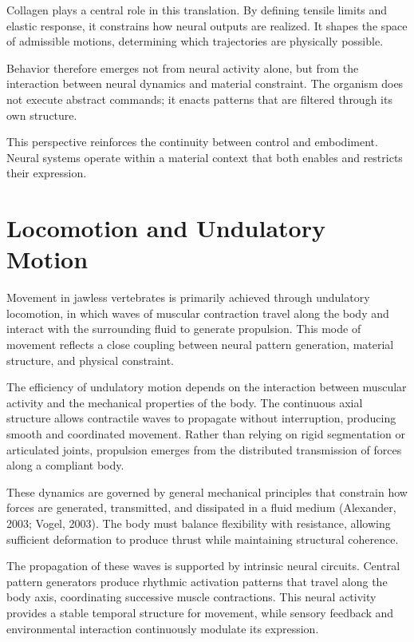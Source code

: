\documentclass[11pt,oneside]{book}
\begin{document}
Collagen plays a central role in this translation. By defining tensile limits and elastic response, it constrains how neural outputs are realized. It shapes the space of admissible motions, determining which trajectories are physically possible.

Behavior therefore emerges not from neural activity alone, but from the interaction between neural dynamics and material constraint. The organism does not execute abstract commands; it enacts patterns that are filtered through its own structure.

This perspective reinforces the continuity between control and embodiment. Neural systems operate within a material context that both enables and restricts their expression.

\section{Locomotion and Undulatory Motion}

Movement in jawless vertebrates is primarily achieved through undulatory locomotion, in which waves of muscular contraction travel along the body and interact with the surrounding fluid to generate propulsion. This mode of movement reflects a close coupling between neural pattern generation, material structure, and physical constraint.

The efficiency of undulatory motion depends on the interaction between muscular activity and the mechanical properties of the body. The continuous axial structure allows contractile waves to propagate without interruption, producing smooth and coordinated movement. Rather than relying on rigid segmentation or articulated joints, propulsion emerges from the distributed transmission of forces along a compliant body.

These dynamics are governed by general mechanical principles that constrain how forces are generated, transmitted, and dissipated in a fluid medium (Alexander, 2003; Vogel, 2003). The body must balance flexibility with resistance, allowing sufficient deformation to produce thrust while maintaining structural coherence.

The propagation of these waves is supported by intrinsic neural circuits. Central pattern generators produce rhythmic activation patterns that travel along the body axis, coordinating successive muscle contractions. This neural activity provides a stable temporal structure for movement, while sensory feedback and environmental interaction continuously modulate its expression.
\end{document}
